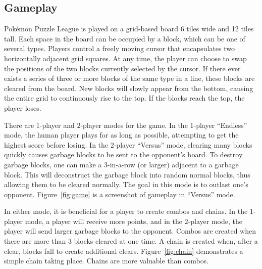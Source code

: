 \documentclass[12pt]{IEEEtran}
\begin{document}
\subsection{Gameplay}
Pok\'{e}mon Puzzle League is played on a grid-based board 6 tiles wide and 12 tiles tall. Each space in the board can be occupied by a block, which can be one of several types. Players control a freely moving cursor that encapsulates two horizontally adjacent grid squares. At any time, the player can choose to swap the positions of the two blocks currently selected by the cursor. If there ever exists a series of three or more blocks of the same type in a line, these blocks are cleared from the board. New blocks will slowly appear from the bottom, causing the entire grid to continuously rise to the top. If the blocks reach the top, the player loses.

There are $1$-player and $2$-player modes for the game. In the $1$-player ``Endless'' mode, the human player plays for as long as possible, attempting to get the highest score before losing. In the $2$-player ``Versus'' mode, clearing many blocks quickly causes garbage blocks to be sent to the opponent's board. To destroy garbage blocks, one can make a $3$-in-a-row (or larger) adjacent to a garbage block. This will deconstruct the garbage block into random normal blocks, thus allowing them to be cleared normally. The goal in this mode is to outlast one's opponent. Figure~\ref{fig:game} is a screenshot of gameplay in ``Versus'' mode.

In either mode, it is beneficial for a player to create combos and chains. In the $1$-player mode, a player will receive more points, and in the $2$-player mode, the player will send larger garbage blocks to the opponent. Combos are created when there are more than $3$ blocks cleared at one time. A chain is created when, after a clear, blocks fall to create additional clears. Figure~\ref{fig:chain} demonstrates a simple chain taking place. Chains are more valuable than combos.
\end{document}
